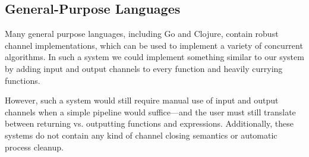 \ifsigpro{ \documentclass[english,PRO]{ipsj} }
\begin{document}



\subsection{General-Purpose Languages}

\noindent
Many general purpose languages, including Go\cite{golang} and Clojure\cite{clojure}, contain robust channel implementations, which can be used to implement a variety of concurrent algorithms. In such a system we could implement something similar to our system by adding input and output channels to every function and heavily currying functions.

% 
% 
However, such a system would still require manual use of input and output channels when a simple pipeline would suffice---and the user must still translate between returning vs. outputting functions and expressions. Additionally, these systems do not contain any kind of channel closing semantics or automatic process cleanup. %
\end{document}
